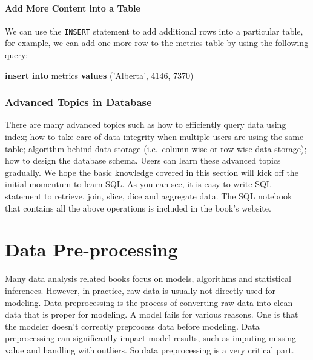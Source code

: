 \documentclass[12pt,]{krantz}
\makeatletter
\newenvironment{Shaded}{\begin{snugshade}}{\end{snugshade}}
\newcommand{\DecValTok}[1]{\textcolor[rgb]{0.06,0.06,0.06}{#1}}
\newcommand{\KeywordTok}[1]{\textcolor[rgb]{0.27,0.27,0.27}{\textbf{#1}}}
\newcommand{\NormalTok}[1]{#1}
\newcommand{\StringTok}[1]{\textcolor[rgb]{0.5,0.5,0.5}{#1}}
\newenvironment{kframe}{%
\medskip{}
\setlength{\fboxsep}{.8em}
 \def\at@end@of@kframe{}%
 \ifinner\ifhmode%
  \def\at@end@of@kframe{\end{minipage}}%
  \begin{minipage}{\columnwidth}%
 \fi\fi%
 \def\FrameCommand##1{\hskip\@totalleftmargin \hskip-\fboxsep
 \colorbox{shadecolor}{##1}\hskip-\fboxsep
     \hskip-\linewidth \hskip-\@totalleftmargin \hskip\columnwidth}%
 \MakeFramed {\advance\hsize-\width
   \@totalleftmargin\z@ \linewidth\hsize
   \@setminipage}}%
 {\par\unskip\endMakeFramed%
 \at@end@of@kframe}
\renewenvironment{Shaded}{\begin{kframe}}{\end{kframe}}
\makeatother
\begin{document}
\hypertarget{add-more-content-into-a-table}{%
\subsubsection{Add More Content into a Table}\label{add-more-content-into-a-table}}

We can use the \texttt{INSERT} statement to add additional rows into a particular table, for example, we can add one more row to the metrics table by using the following query:

\begin{Shaded}
\begin{Highlighting}[]
\KeywordTok{insert} \KeywordTok{into}\NormalTok{ metrics}
\KeywordTok{values}\NormalTok{ (}\StringTok{'Alberta'}\NormalTok{, }\DecValTok{4146}\NormalTok{, }\DecValTok{7370}\NormalTok{)}
\end{Highlighting}
\end{Shaded}

\hypertarget{advanced-topics-in-database}{%
\subsection{Advanced Topics in Database}\label{advanced-topics-in-database}}

There are many advanced topics such as how to efficiently query data using index; how to take care of data integrity when multiple users are using the same table; algorithm behind data storage (i.e.~column-wise or row-wise data storage); how to design the database schema. Users can learn these advanced topics gradually. We hope the basic knowledge covered in this section will kick off the initial momentum to learn SQL. As you can see, it is easy to write SQL statement to retrieve, join, slice, dice and aggregate data. The SQL notebook that contains all the above operations is included in the book's website.

\hypertarget{datapreprocessing}{%
\chapter{Data Pre-processing}\label{datapreprocessing}}

Many data analysis related books focus on models, algorithms and statistical inferences. However, in practice, raw data is usually not directly used for modeling. Data preprocessing is the process of converting raw data into clean data that is proper for modeling. A model fails for various reasons. One is that the modeler doesn't correctly preprocess data before modeling. Data preprocessing can significantly impact model results, such as imputing missing value and handling with outliers. So data preprocessing is a very critical part.
\end{document}
